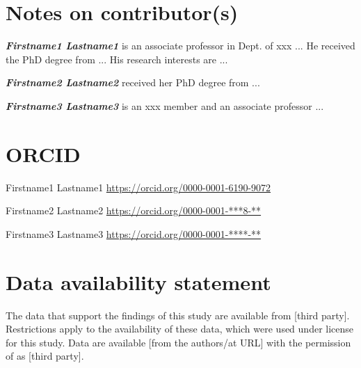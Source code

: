 \documentclass[12pt]{gsis}  %
\begin{document}
\section*{Notes on contributor(s)}
\noindent \emph{\textbf{Firstname1 Lastname1}} is an associate professor in Dept. of xxx ... He received the PhD degree from ... His research interests are ...

\noindent \emph{\textbf{Firstname2 Lastname2}} received her PhD degree from ...

\noindent \emph{\textbf{Firstname3 Lastname3}} is an xxx member and an associate professor ...

\section*{ORCID}
\noindent Firstname1 Lastname1 \quad \url{https://orcid.org/0000-0001-6190-9072}

\noindent Firstname2 Lastname2 \quad  \url{https://orcid.org/0000-0001-***8-**}

\noindent Firstname3 Lastname3    \quad     \url{https://orcid.org/0000-0001-****-**}

\section*{Data availability statement}
The data that support the findings of this study are available from [third party]. Restrictions apply to the availability of these data, which were used under license for this study. Data are available [from the authors/at URL] with the permission of
as [third party].
\end{document}
